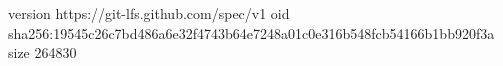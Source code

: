version https://git-lfs.github.com/spec/v1
oid sha256:19545c26c7bd486a6e32f4743b64e7248a01c0e316b548fcb54166b1bb920f3a
size 264830
